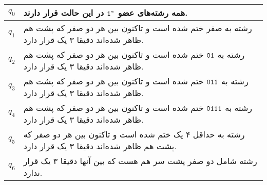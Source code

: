 \documentclass{article}
\begin{document}
\begin{enumerate}
\begin{center}
\end{center}
	
	\begin{center}
			\begin{tabularx}{\textwidth}{|c|X|}
			\hline
			$q_0$ &		
			همه رشته‌های عضو 
			$\tt 1^*$
			در این حالت قرار دارند.
			\\ \hline
			$q_1$ &								
	رشته به صفر ختم شده است و تاکنون بین هر دو صفر که پشت هم ظاهر شده‌اند دقیقا ۳ یک قرار دارد.
			\\ \hline
			$q_2$ &						
			رشته به 
			$\tt 01 $ 
			ختم شده است و تاکنون بین هر دو صفر که پشت هم ظاهر شده‌اند دقیقا ۳ یک قرار دارد.
			\\ \hline
			$q_3$ &				
			رشته به 
			$\tt 011 $
			 ختم شده است و تاکنون بین هر دو صفر که پشت هم ظاهر شده‌اند دقیقا ۳ یک قرار دارد.
			\\ \hline
			$q_4$ &				
		رشته به 
		$ \tt 0111 $ 
		ختم شده است و تاکنون بین هر دو صفر که پشت هم ظاهر شده‌اند دقیقا ۳ یک قرار دارد.
			\\ \hline
			$q_5$ &
			رشته به حداقل ۴ یک ختم شده است و تاکنون بین هر دو صفر که پشت هم ظاهر شده‌اند دقیقا ۳ یک قرار دارد.
			\\ \hline
			$q_6$ &
			رشته شامل دو صفر پشت سر هم هست که بین آنها دقیقا ۳ یک قرار ندارد.
			\\ \hline
		\end{tabularx}
	\end{center}
	

\end{enumerate}
\end{document}
